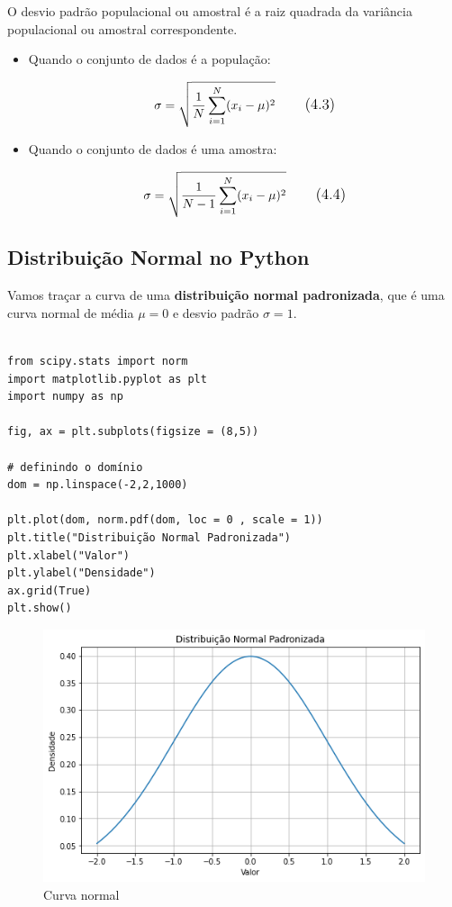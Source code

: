 O desvio padrão populacional ou amostral é a raiz quadrada da variância populacional ou amostral correspondente. 

\begin{itemize}

\item Quando o conjunto de dados é a população:

\begin{equation}
\large \sigma = \sqrt{\frac{1}{N}\sum_{i=1}^{N}(x_{i}-\mu )^2} 
\tag{4.3}
\end{equation}
	
\item Quando o conjunto de dados é uma amostra:

\begin{equation}
\large \sigma = \sqrt{\frac{1}{N-1}\sum_{i=1}^{N}(x_{i}-\mu )^2} 
\tag{4.4}
\end{equation}
	
\end{itemize}

\subsection{Distribuição Normal no Python}

Vamos traçar a curva de uma \textbf{distribuição normal padronizada}, que é uma curva normal de média $\mu = 0$ e desvio padrão $\sigma = 1$.

\begin{verbatim}
	
from scipy.stats import norm
import matplotlib.pyplot as plt
import numpy as np 

fig, ax = plt.subplots(figsize = (8,5))

# definindo o domínio
dom = np.linspace(-2,2,1000)

plt.plot(dom, norm.pdf(dom, loc = 0 , scale = 1))
plt.title("Distribuição Normal Padronizada")
plt.xlabel("Valor")
plt.ylabel("Densidade")
ax.grid(True)
plt.show()

\end{verbatim}

\begin{figure}[H]
	\centering
	\includegraphics[width=1\textwidth]{./Imagens/Distribuição Normal/GA2.png} 
	\caption{Curva normal}
	\label{fig:GA2}
\end{figure}

